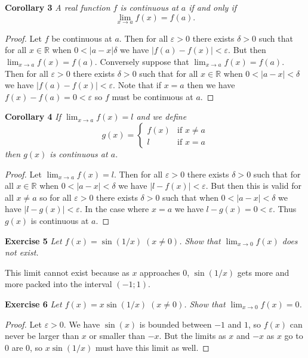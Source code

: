 \documentclass{article}
\begin{document}
\begin{flushleft}
\textbf{Corollary 3}
\textsl{A real function $f$ is continuous at $a$ if and only if
\[
\lim_{x \rightarrow a} f(x) = f(a).
\]}
\begin{proof}
Let $f$ be continuous at $a$. Then for all $\varepsilon > 0$ there exists $\delta > 0$ such that for all $x \in \mathbb{R}$ when $0 < |a - x| \delta$ we have $|f(a) - f(x)| < \varepsilon$. But then $\lim_{x \rightarrow a} f(x) = f(a)$. Conversely suppose that $\lim_{x \rightarrow a} f(x) = f(a)$. Then for all $\varepsilon > 0$ there exists $\delta > 0$ such that for all $x \in \mathbb{R}$ when $0 < |a-x| < \delta$ we have $|f(a)-f(x)| < \varepsilon$. Note that if $x=a$ then we have $f(x)-f(a) = 0 < \varepsilon$ so $f$ must be continuous at $a$.
\end{proof}

\textbf{Corollary 4}
\textsl{If $\lim_{x \rightarrow a} f(x) = l$ and we define
\[
g(x)=
\begin{cases}
f(x) & \text{if } x \neq a\\
l & \text{if } x = a
\end{cases}
\]
then $g(x)$ is continuous at $a$.}
\begin{proof}
Let $\lim_{x \rightarrow a} f(x) = l$. Then for all $\varepsilon > 0$ there exists $\delta > 0$ such that for all $x \in \mathbb{R}$ when $0 < |a-x| < \delta$ we have $|l - f(x)| < \varepsilon$. But then this is valid for all $x \neq a$ so for all $\varepsilon > 0$ there exists $\delta > 0$ such that when $0 < |a-x| < \delta$ we have $|l - g(x)| < \varepsilon$. In the case where $x=a$ we have $l-g(x) = 0 < \varepsilon$. Thus $g(x)$ is continuous at $a$.
\end{proof}

\textbf{Exercise 5}
\textsl{Let $f(x)= \sin (1/x) \; (x \neq 0)$. Show that $\lim_{x \rightarrow 0} f(x)$ does not exist.}\newline

This limit cannot exist because as $x$ approaches $0$, $\sin (1/x)$ gets more and more packed into the interval $(-1;1)$.\newline

\textbf{Exercise 6}
\textsl{Let $f(x)=x \sin (1/x) \; (x \neq 0)$. Show that $\lim_{x \rightarrow 0} f(x) = 0$.}
\begin{proof}
Let $\varepsilon > 0$. We have $\sin (x)$ is bounded between $-1$ and $1$, so $f(x)$ can never be larger than $x$ or smaller than $-x$. But the limits as $x$ and $-x$ as $x$ go to $0$ are $0$, so $x \sin (1/x)$ must have this limit as well.
\end{proof}


\end{flushleft}
\end{document}

